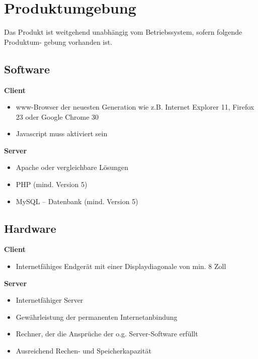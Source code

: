 \section{Produktumgebung}
\label{sec:Produktumgebung}

Das Produkt ist weitgehend unabhängig vom Betriebssystem, sofern folgende Produktum-
gebung vorhanden ist.

\subsection{Software}
\label{sec:Software}

\textbf{Client}
\begin{itemize}
  \item www-Browser der neuesten Generation wie z.B. Internet Explorer 11, Firefox 23 oder Google Chrome 30
  \item Javascript muss aktiviert sein
\end{itemize}

\textbf{Server}
\begin{itemize}
  \item Apache oder vergleichbare Lösungen
  \item PHP (mind. Version 5)
  \item MySQL – Datenbank (mind. Version 5)
\end{itemize}

\subsection{Hardware}
\label{sec:Hardware}

\textbf{Client}
\begin{itemize}
  \item  Internetfähiges Endgerät mit einer Displaydiagonale von min. 8 Zoll
\end{itemize}

\textbf{Server}
\begin{itemize}
  \item Internetfähiger Server
  \item Gewährleistung der permanenten Internetanbindung
  \item Rechner, der die Ansprüche der o.g. Server-Software erfüllt
  \item Ausreichend Rechen- und Speicherkapazität
\end{itemize}